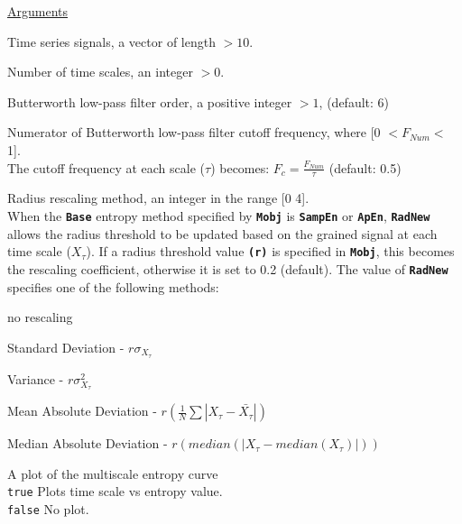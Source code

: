 \documentclass[12pt, a4paper, titlepage, openany]{book}
\begin{document}
\noindent \ul{Arguments}
\begin{description}[labelsep=1cm, labelwidth=2cm, nosep, style=multiline,leftmargin=3cm]\footnotesize
\item[\texttt{Sig}]		Time series signals, a vector of length $> 10$.
\item[\texttt{Scales}]		Number of time scales, an integer  $> 0$.
\item[\texttt{F\_Order}]	 Butterworth low-pass filter order, a positive integer $ > 1$, (default: 6) 
\item[\texttt{F\_Num}]	 Numerator of Butterworth low-pass filter cutoff frequency, where [0 $ <  F_{Num} < $ 1]. \\
The cutoff frequency at each scale ($\tau$) becomes: $F_{c} = \frac{F_{Num}}{\tau}$  (default: 0.5)
\item[\texttt{RadNew}]			Radius rescaling method, an integer in the range [0 4].\\
				 When the \texttt{\textbf{Base}} entropy method specified by \texttt{\textbf{Mobj}} is \texttt{\textbf{SampEn}} or \texttt{\textbf{ApEn}}, \texttt{\textbf{RadNew}} allows the radius threshold to be updated based on the grained signal at each time scale ($X_\tau$). If a radius threshold value \texttt{\textbf{(r)}} is specified in \texttt{\textbf{Mobj}},  this becomes the rescaling coefficient, otherwise it is set to 0.2 (default). The value of \texttt{\textbf{RadNew}} specifies one of the following methods:
	\begin{description}[labelsep=5em, labelwidth=4em, nosep,style=multiline,leftmargin=2cm]
		\item[0]	no rescaling
		\item[1]    Standard Deviation          - $r\sigma_{X_\tau}$
        \item[2]    Variance                    - $r\sigma_{X_\tau}^2$
        \item[3]    Mean Absolute Deviation     - $r(\frac{1}{N} \sum |X_{\tau} - \bar{X_{\tau}}|) $
        \item[4]    Median Absolute Deviation   - $r(median(|X_{\tau} - median(X_{\tau})|)) $
	\end{description} 
\item[\texttt{Plotx}]		A plot of the multiscale entropy curve\\
							\texttt{true} \hspace{15pt} Plots time scale vs entropy value.\\
							\texttt{false}\hspace{12pt} No plot.\\

\end{description}
\end{document}
